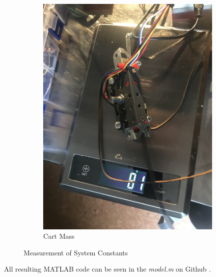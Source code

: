 \documentclass[12pt]{article}
\begin{document}
\begin{figure}[H]
\begin{subfigure}{.49\textwidth}
      \includegraphics[width=1\linewidth]{figures/weigh2.jpg}
      \caption{Cart Mass}
      \label{fig:cMass}
    \end{subfigure}
    \caption{Measurement of System Constants}
    \label{fig:measure}
\end{figure}
All resulting MATLAB code can be seen in the \textit{model.m} on Github \cite{github}.
\end{document}
